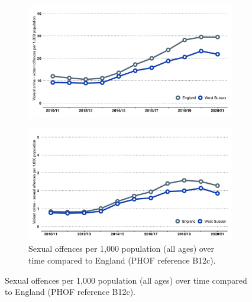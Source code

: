 \begin{figure}
\begin{subfigure}[t]{0.45\textwidth}
        \includegraphics[width=\textwidth]{images/violent_offenses_line.png}
    \end{subfigure}
    \begin{subfigure}[t]{0.45\textwidth}
        \caption[Sexual offences per 1,000 population (all ages) over time]{Sexual offences per 1,000 population (all ages) over time compared to England (PHOF reference B12c).}\label{fig:sexual_off:time}
        \centering
        \includegraphics[width=\textwidth]{images/sexual_offences_line.png}
    \end{subfigure}
\end{figure}

\clearpage





